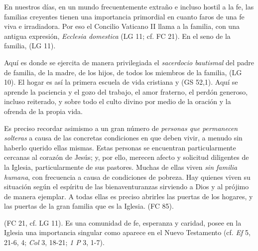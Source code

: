 	 En nuestros días, en un mundo frecuentemente extraño e incluso hostil a la fe, las familias creyentes tienen una importancia primordial en cuanto faros de una fe viva e irradiadora. Por eso el Concilio Vaticano II llama a la familia, con una antigua expresión, \emph{Ecclesia domestica} (LG 11; cf. FC 21). En el seno de la familia,  (LG 11).
	
	 Aquí es donde se ejercita de manera privilegiada el \emph{sacerdocio bautismal} del padre de familia, de la madre, de los hijos, de todos los miembros de la familia,  (LG 10). El hogar es así la primera escuela de vida cristiana y  (GS 52,1). Aquí se aprende la paciencia y el gozo del trabajo, el amor fraterno, el perdón generoso, incluso reiterado, y sobre todo el culto divino por medio de la oración y la ofrenda de la propia vida.
	
	 Es preciso recordar asimismo a un gran número de \emph{personas que permanecen solteras} a causa de las concretas condiciones en que deben vivir, a menudo sin haberlo querido ellas mismas. Estas personas se encuentran particularmente cercanas al corazón de Jesús; y, por ello, merecen afecto y solicitud diligentes de la Iglesia, particularmente de sus pastores. Muchas de ellas viven \emph{sin familia humana}, con frecuencia a causa de condiciones de pobreza. Hay quienes viven su situación según el espíritu de las bienaventuranzas sirviendo a Dios y al prójimo de manera ejemplar. A todas ellas es preciso abrirles las puertas de los hogares,  y las puertas de la gran familia que es la Iglesia.  (FC 85).
	
	  (FC 21, cf. LG 11). Es una comunidad de fe, esperanza y caridad, posee en la Iglesia una importancia singular como aparece en el Nuevo Testamento (cf. \emph{Ef} 5, 21-6, 4; \emph{Col} 3, 18-21; \emph{1 P} 3, 1-7).
	
